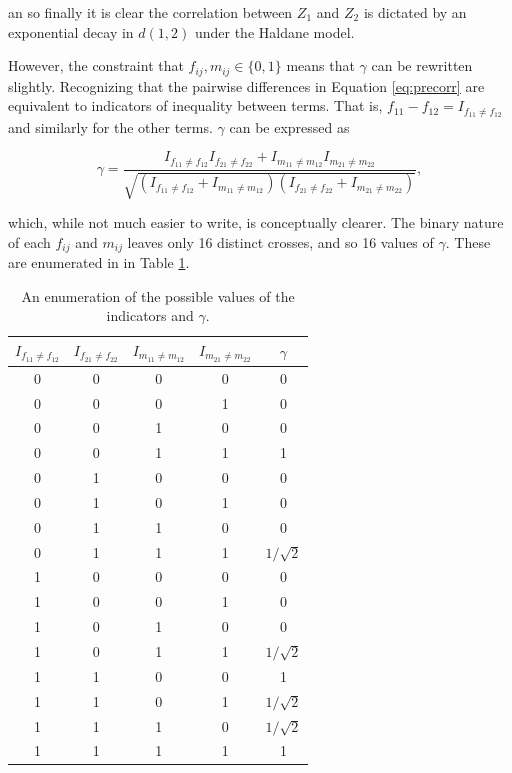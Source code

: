 \documentclass{article}
\begin{document}
\noindent an so finally it is clear the correlation between $Z_1$ and $Z_2$ is dictated by an exponential decay in $d(1,2)$ under the Haldane model.

However, the constraint that $f_{ij}, m_{ij} \in \{0, 1\}$ means that $\gamma$ can be rewritten slightly. Recognizing that the pairwise differences in Equation \ref{eq:precorr} are equivalent to indicators of inequality between terms. That is, $f_{11} - f_{12} = I_{f_{11} \neq f_{12}}$ and similarly for the other terms. $\gamma$ can be expressed as

$$\gamma =  \frac{ I_{f_{11} \neq f_{12}} I_{f_{21} \neq f_{22}} + I_{m_{11} \neq m_{12}}I_{m_{21} \neq m_{22}} }{ \sqrt{ \left ( I_{f_{11} \neq f_{12}} + I_{m_{11} \neq m_{12}} \right ) \left ( I_{f_{21} \neq f_{22}} + I_{m_{21} \neq m_{22}} \right ) }},$$

\noindent which, while not much easier to write, is conceptually clearer. The binary nature of each $f_{ij}$ and $m_{ij}$ leaves only 16 distinct crosses, and so 16 values of $\gamma$. These are enumerated in in Table \ref{tab:gamma}.

\begin{table}[!ht]
  \centering
  \caption{An enumeration of the possible values of the indicators and $\gamma$.}
  \label{tab:gamma}
  \begin{tabular}{|c c c c|c|} \hline
    $I_{f_{11} \neq f_{12}}$ & $I_{f_{21} \neq f_{22}}$ & $I_{m_{11} \neq m_{12}}$ & $I_{m_{21} \neq m_{22}}$ & $\gamma$ \\ \hline
    0 & 0 & 0 & 0 & 0 \\ \hline
    0 & 0 & 0 & 1 & 0 \\ \hline 
    0 & 0 & 1 & 0 & 0 \\ \hline
    0 & 0 & 1 & 1 & 1 \\ \hline
    0 & 1 & 0 & 0 & 0 \\ \hline
    0 & 1 & 0 & 1 & 0 \\ \hline
    0 & 1 & 1 & 0 & 0 \\ \hline
    0 & 1 & 1 & 1 & $1 / \sqrt{2}$ \\ \hline
    1 & 0 & 0 & 0 & 0 \\ \hline
    1 & 0 & 0 & 1 & 0 \\ \hline
    1 & 0 & 1 & 0 & 0 \\ \hline
    1 & 0 & 1 & 1 & $1 / \sqrt{2}$ \\ \hline
    1 & 1 & 0 & 0 & 1 \\ \hline
    1 & 1 & 0 & 1 & $1 / \sqrt{2}$ \\ \hline
    1 & 1 & 1 & 0 & $1 / \sqrt{2}$ \\ \hline
    1 & 1 & 1 & 1 & 1 \\ \hline
  \end{tabular}
\end{table}   
\end{document}
